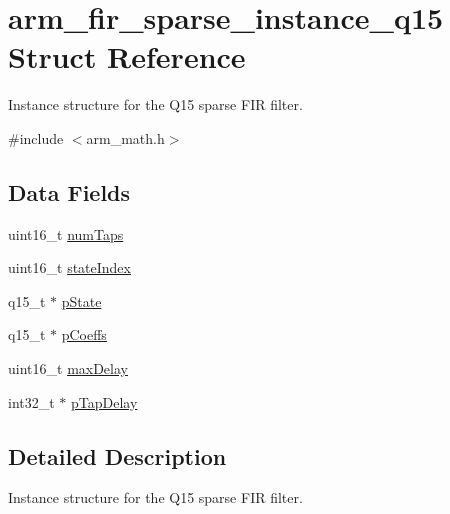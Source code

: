\hypertarget{structarm__fir__sparse__instance__q15}{\section{arm\-\_\-fir\-\_\-sparse\-\_\-instance\-\_\-q15 Struct Reference}
\label{structarm__fir__sparse__instance__q15}
}


Instance structure for the Q15 sparse F\-I\-R filter.  




{\ttfamily \#include $<$arm\-\_\-math.\-h$>$}

\subsection*{Data Fields}
\begin{DoxyCompactItemize}
\item 
uint16\-\_\-t \hyperlink{structarm__fir__sparse__instance__q15_a751941891e47f522a7f5375fe8990aac}{num\-Taps}
\item 
uint16\-\_\-t \hyperlink{structarm__fir__sparse__instance__q15_a566a0cb53437e48b9a3bf18e5b03d8aa}{state\-Index}
\item 
q15\-\_\-t $\ast$ \hyperlink{structarm__fir__sparse__instance__q15_ae29dfdb736374fcddaeaec4b7770170c}{p\-State}
\item 
q15\-\_\-t $\ast$ \hyperlink{structarm__fir__sparse__instance__q15_a7ca181a37f714d174445f486bebce26f}{p\-Coeffs}
\item 
uint16\-\_\-t \hyperlink{structarm__fir__sparse__instance__q15_ab25f4ee7550e6d92acff77ada283733f}{max\-Delay}
\item 
int32\-\_\-t $\ast$ \hyperlink{structarm__fir__sparse__instance__q15_adec00b3793ab4f08edfeb4ea6a9eb6e6}{p\-Tap\-Delay}
\end{DoxyCompactItemize}


\subsection{Detailed Description}
Instance structure for the Q15 sparse F\-I\-R filter. 

